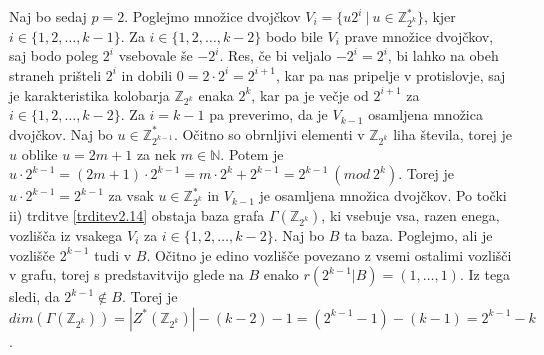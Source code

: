 \documentclass[mat1, tisk]{fmfdelo}
\newcommand{\N}{\mathbb N}
\newcommand{\Z}{\mathbb Z}
\begin{document}
\begin{dokaz}
  Naj bo sedaj $p = 2$. Poglejmo množice dvojčkov $V_i = \{u 2^i~|~  u \in  \Z_{2^k}^{*}\}$, kjer 
  $i \in \{1, 2, \ldots, k-1\}$. Za $i \in \{1, 2, \ldots, k-2\}$ bodo bile $V_i$ prave množice dvojčkov, saj 
  bodo poleg $2^i$ vsebovale še $-2^i$. Res, če bi veljalo $-2^i = 2^i$, bi lahko na obeh straneh prišteli 
  $2^i$ in dobili $0 = 2 \cdot 2^i = 2^{i+1}$, kar pa nas pripelje v protislovje, saj je karakteristika 
  kolobarja $\Z_{2^k}$ enaka $2^k$, kar pa je večje od $2^{i+1}$ za $i \in \{1, 2, \ldots, k-2\}$.
  Za $i = k-1$ pa preverimo, da je $V_{k-1}$ osamljena množica dvojčkov. Naj bo $u \in \Z_{2^{k-1}}^{*}$. 
  Očitno so obrnljivi elementi v $\Z_{2^{k}}$ liha števila, torej je $u$ oblike $u = 2m + 1$ za nek 
  $m \in \N$. Potem je $u \cdot 2^{k-1} = (2m + 1) \cdot 2^{k-1} = m \cdot 2^{k} + 2^{k-1} = 2^{k-1} ~(mod~2^{k})$. 
  Torej je $u \cdot 2^{k-1} = 2^{k-1}$ za vsak $u \in \Z_{2^{k}}^{*}$ in $V_{k-1}$ je osamljena 
  množica dvojčkov. Po točki ii) trditve \ref{trditev2.14} obstaja baza grafa $\Gamma(\Z_{2^k})$, 
  ki vsebuje vsa, razen enega, vozlišča iz vsakega $V_i$ za $i \in \{1, 2, \ldots, k-2\}$. Naj bo 
  $B$ ta baza. Poglejmo, ali je vozlišče $2^{k-1}$ tudi v $B$. Očitno je edino vozlišče povezano z 
  vsemi ostalimi vozlišči v grafu, torej s predstavitvijo glede na $B$ enako 
  $r(2^{k-1}|B) = (1, \ldots, 1)$. Iz tega sledi, da $2^{k-1} \notin B$. Torej je 
  $dim(\Gamma(\Z_{2^{k}})) = |Z^*(\Z_{2^k})| - (k - 2) - 1 = (2^{k-1} - 1) - (k - 1) = 2^{k-1} - k$.
\end{dokaz}
\end{document}
